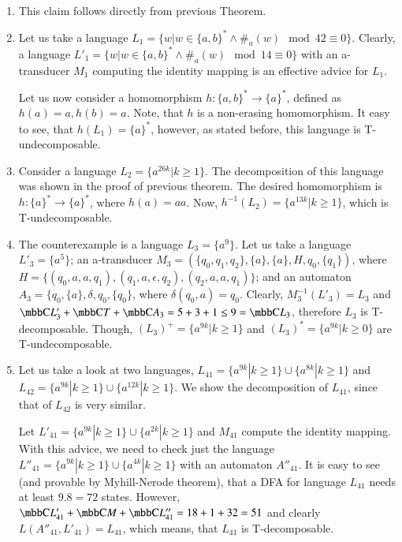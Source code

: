 \paragraph{}
\dokaz
\begin{enumerate}
\item This claim follows directly from previous Theorem.

\item Let us take a language $L_1 = \{w|w \in \{ a,b\}^* \wedge \#_{a}(w) \mod 42 \equiv 0 \}$. Clearly, a language $L'_1 = \{w|w \in \{ a,b\}^* \wedge \#_{a}(w) \mod 14 \equiv 0 \}$ with an a-transducer $M_1$ computing the identity mapping is an effective advice for $L_1$.

Let us now consider a homomorphism $h: \{ a,b\}^* \to \{ a \}^*$, defined as $h(a) = a, h(b) = a$. Note, that $h$ is a non-erasing homomorphism. It easy to see, that $h(L_1) = \{ a \}^*$, however, as stated before, this language is T-undecomposable.

\item Consider a language $L_2 = \{ a^{26k} | k \geq 1 \}$. The decomposition of this language was shown in the proof of previous theorem. The desired homomorphism is $h: \{a\}^* \to \{a\}^*$, where $h(a) = aa$. Now, $h^{-1}(L_2) = \{ a^{13k} | k \geq 1 \}$, which is T-undecomposable.

\item
The counterexample is a language $L_3 = \{ a^{9} \}$. Let us take a language $L'_3 = \{ a^{5} \}$; an a-transducer $M_3 = (\{q_0, q_1, q_2\}, \{a\}, \{a\}, H, q_0, \{q_1\})$, where $H = \{ (q_0, a, a, q_1), (q_1, a, \epsilon, q_2),\allowbreak (q_2, a, a, q_1) \}$; and an automaton $A_3 = \{q_0, \{a\}, \delta, q_0, \{q_0\} $, where $\delta(q_0, a) = q_0$. Clearly, $M_3^{-1}(L'_3) = L_3$ and $\C{L'_3} + \C{T} + \C{A_3} = 5 + 3 + 1 \leq 9 = \C{L_3}$, therefore $L_3$ is T-decomposable. Though, $(L_3)^+ = \{ a^{9k} | k \geq 1 \}$ and $(L_3)^* = \{ a^{9k} | k \geq 0 \}$ are T-undecomposable.

\item Let us take a look at two languages, $L_{41} = \{ a^{9k} | k \geq 1 \} \cup \{ a^{8k} | k \geq 1 \}$ and $L_{42} = \{ a^{9k} | k \geq 1 \} \cup \{ a^{12k} | k \geq 1 \}$. We show the decomposition of $L_{41}$, since that of $L_{42}$ is very similar.

Let $L'_{41} = \{ a^{9k} | k \geq 1 \} \cup \{ a^{2k} | k \geq 1 \}$ and $M_{41}$ compute the identity mapping. With this advice, we need to check just the language $L''_{41} = \{ a^{9k} | k \geq 1 \} \cup \{ a^{4k} | k \geq 1 \}$ with an automaton $A''_{41}$. It is easy to see (and provable by Myhill-Nerode theorem), that a DFA for language $L_{41}$ needs at least $9.8 = 72$ states. However, $\C{L'_{41}} + \C{M} + \C{L''_{41}} = 18 + 1 + 32 = 51$ and clearly $L(A''_{41}, L'_{41}) = L_{41}$, which means, that $L_{41}$ is T-decomposable.


\end{enumerate}
